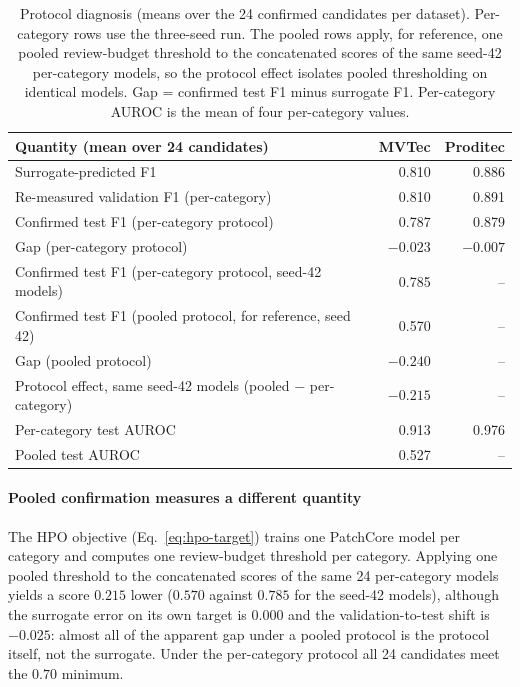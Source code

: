\documentclass[final,5p,times,twocolumn]{elsarticle}
\begin{document}
\begin{table}[!t] \centering \footnotesize \caption{Protocol diagnosis (means over the 24 confirmed candidates per
dataset). Per-category rows use the three-seed run. The pooled rows apply, for reference, one pooled review-budget threshold to the concatenated scores of the same seed-42 per-category models, so the protocol effect isolates pooled thresholding on identical models. Gap = confirmed test F1 minus surrogate F1. Per-category AUROC is the mean of four per-category
values.}
\label{tab:gap-diagnosis}
\setlength{\tabcolsep}{2.5pt}
\begin{tabular}{@{}p{}rr@{}}
\toprule
Quantity (mean over 24 candidates) & MVTec & Proditec \\
\midrule
Surrogate-predicted F1                                 & 0.810 & 0.886 \\
Re-measured validation F1 (per-category)               & 0.810 & 0.891 \\
Confirmed test F1 (per-category protocol)              & 0.787 & 0.879 \\
Gap (per-category protocol)                            & $-0.023$ & $-0.007$ \\
Confirmed test F1 (per-category protocol, seed-42 models) & 0.785 & -- \\
Confirmed test F1 (pooled protocol, for reference, seed 42) & 0.570 & -- \\
Gap (pooled protocol)                                  & $-0.240$ & -- \\
Protocol effect, same seed-42 models (pooled $-$ per-category) & $-0.215$ & -- \\
\midrule
Per-category test AUROC                                & 0.913 & 0.976 \\
Pooled test AUROC                                      & 0.527 & -- \\
\bottomrule
\end{tabular}
\end{table}

\paragraph{Pooled confirmation measures a different quantity}
The HPO objective (Eq.~\ref{eq:hpo-target}) trains one PatchCore model
per category and computes one review-budget threshold per category.
Applying one pooled threshold to the concatenated scores of the same 24 per-category models yields a score $0.215$ lower ($0.570$ against
$0.785$ for the seed-42 models), although the surrogate error on its own
target is $0.000$ and the validation-to-test shift is $-0.025$: almost
all of the apparent gap under a pooled protocol is the protocol itself,
not the surrogate. Under the per-category protocol all 24 candidates
meet the $0.70$ minimum.
\end{document}
